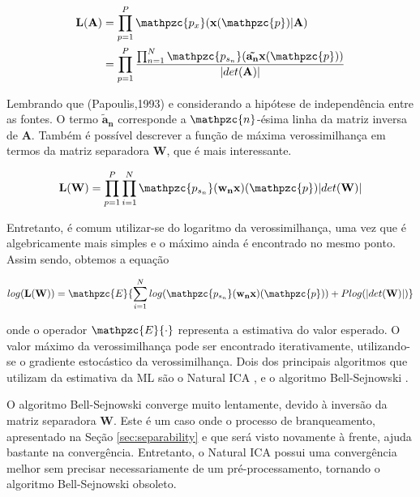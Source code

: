         \begin{equation}\label{eq:verobss}
          \begin{split}
         \mathbf{L(A)} & =\prod_{p=1}^P \mathpzc{p_x}(\mathbf{x}(\mathpzc{p}) | \mathbf{A})\\
                                & =\prod_{p=1}^P\frac{\prod_{n=1}^N\mathpzc{p_{s_n}}(\mathbf{\tilde{a_n}}\mathbf{x}(\mathpzc{p}))}{| det(\mathbf{A}) |}
        \end{split}
    \end{equation}
    
    Lembrando que (Papoulis,1993) e considerando a hipótese de independência entre as fontes. O termo $\mathbf{\tilde{a}_n}$ corresponde a $\mathpzc{n}$-ésima linha da matriz inversa de $\mathbf{A}$. Também é possível descrever a função de máxima verossimilhança em termos da matriz separadora $\mathbf{W}$, que é mais interessante.

    \begin{equation}
        \label{eq:veroForW}
        \mathbf{L(W)} = \prod_{p=1}^{P}\prod_{i=1}^N\mathpzc{p_{s_n}}(\mathbf{w_nx})(\mathpzc{p})|det(\mathbf{W})|
    \end{equation}
  
      Entretanto, é comum utilizar-se do logaritmo da verossimilhança, uma vez que é algebricamente mais simples e o máximo ainda é encontrado no mesmo ponto. Assim sendo, obtemos a equação
    
        \begin{equation}
        \label{eq:logverossimilance}
        log(\mathbf{L(W)}) = \mathpzc{E}\{\sum_{i=1}^Nlog(\mathpzc{p_{s_n}}(\mathbf{w_nx})(\mathpzc{p})) + P log(|det(\mathbf{W})|)\}
    \end{equation}
    
    onde o operador $\mathpzc{E}\{\cdot\}$ representa a estimativa do valor esperado. O valor máximo da verossimilhança pode ser encontrado iterativamente, utilizando-se o gradiente estocástico da verossimilhança. Dois dos principais algoritmos que utilizam da estimativa da ML são o Natural ICA \cite{NaturalICA}, e o algoritmo Bell-Sejnowski \cite{Bell}.
    
    O algoritmo Bell-Sejnowski converge muito lentamente, devido à inversão da matriz separadora $\mathbf{W}$. Este é um caso onde o processo de branqueamento, apresentado na Seção \ref{sec:separability} e que será visto novamente à frente, ajuda bastante na convergência. Entretanto, o Natural ICA possui uma convergência melhor sem precisar necessariamente de um pré-processamento, tornando o algoritmo Bell-Sejnowski obsoleto.
    
